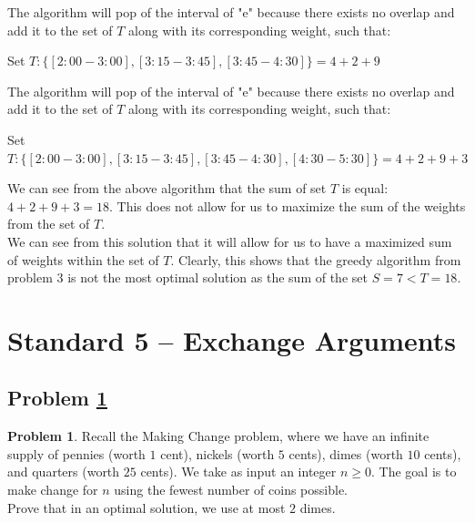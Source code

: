 \documentclass[11pt]{article}
\theoremstyle{definition}
\theoremstyle{definition}
\newtheorem{required}{Problem}
\theoremstyle{definition}
\begin{document}
The algorithm will pop of the interval of "e" because there exists no overlap and add it to the set of $T$ along with its corresponding weight, such that: \\
\begin{center}
Set $T: \{[2:00 - 3:00], [3:15 - 3:45], [3:45 - 4:30]\} = 4 + 2 + 9$\\
\end{center}
The algorithm will pop of the interval of "e" because there exists no overlap and add it to the set of $T$ along with its corresponding weight, such that: \\
\begin{center}
Set $T: \{[2:00 - 3:00], [3:15 - 3:45], [3:45 - 4:30], [4:30 - 5:30]\} = 4 + 2 + 9 + 3$\\
\end{center}
We can see from the above algorithm that the sum of set $T$ is equal: $4 + 2 + 9 + 3 = 18$. This does not allow for us to maximize the sum of the weights from the set of $T$. \\
We can see from this solution that it will allow for us to have a maximized sum of weights within the set of $T$. Clearly, this shows that the greedy algorithm from problem 3 is not the most optimal solution as the sum of the set $S = 7 < T = 18$. 


\newpage
\section{Standard 5 -- Exchange Arguments}
\setcounter{subsection}{4}
\subsection{Problem \ref{Exchange1}}
\begin{required} \label{Exchange1}
Recall the Making Change problem, where we have an infinite supply of pennies (worth $1$ cent), nickels (worth $5$ cents), dimes (worth $10$ cents), and quarters (worth $25$ cents). We take as input an integer $n \geq 0$. The goal is to make change for $n$ using the fewest number of coins possible. \\

\noindent Prove that in an optimal solution, we use at most $2$ dimes. 
\end{required}
\end{document}
